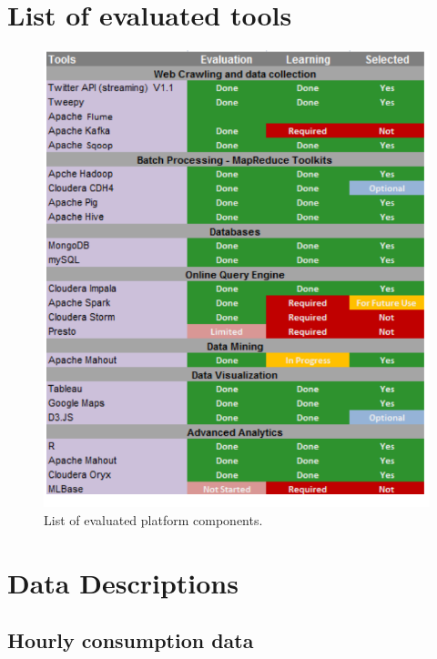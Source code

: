 \chapter{List of evaluated tools}
\label{chapter:first-appendixa}
\begin{figure}[!ht]
    \begin{center}
      \includegraphics[scale=0.92]{images/appenda.pdf}
      \caption{List of evaluated platform components.}
      \label{fig:list_eval}
    \end{center}
\end{figure} 

\chapter{Data Descriptions}
\label{chapter:appendixc}

\section{Hourly consumption data}

